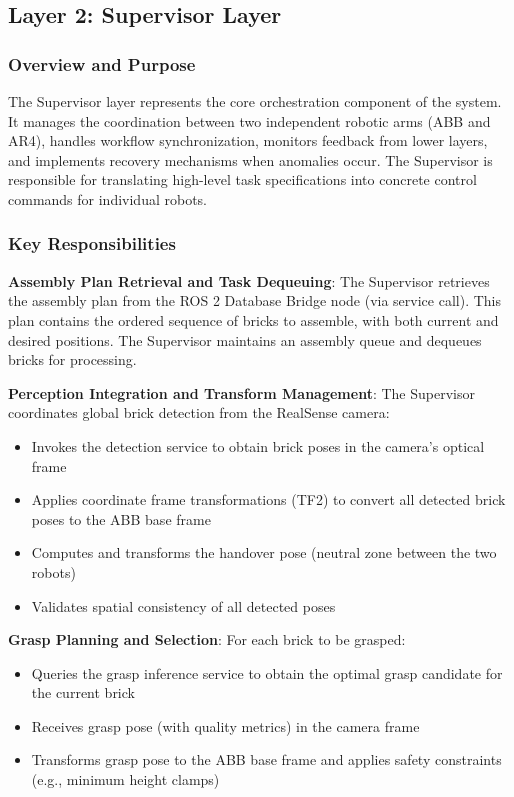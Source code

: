 \subsection{Layer 2: Supervisor Layer}
\label{subsec:supervisor_layer}

\subsubsection{Overview and Purpose}
The Supervisor layer represents the core orchestration component of the system. It manages the coordination between two independent robotic arms (ABB and AR4), handles workflow synchronization, monitors feedback from lower layers, and implements recovery mechanisms when anomalies occur. The Supervisor is responsible for translating high-level task specifications into concrete control commands for individual robots.

\subsubsection{Key Responsibilities}

\textbf{Assembly Plan Retrieval and Task Dequeuing}: The Supervisor retrieves the assembly plan from the ROS 2 Database Bridge node (via service call). This plan contains the ordered sequence of bricks to assemble, with both current and desired positions. The Supervisor maintains an assembly queue and dequeues bricks for processing.

\textbf{Perception Integration and Transform Management}: The Supervisor coordinates global brick detection from the RealSense camera:
\begin{itemize}
    \item Invokes the detection service to obtain brick poses in the camera's optical frame
    \item Applies coordinate frame transformations (TF2) to convert all detected brick poses to the ABB base frame
    \item Computes and transforms the handover pose (neutral zone between the two robots)
    \item Validates spatial consistency of all detected poses
\end{itemize}

\textbf{Grasp Planning and Selection}: For each brick to be grasped:
\begin{itemize}
    \item Queries the grasp inference service to obtain the optimal grasp candidate for the current brick
    \item Receives grasp pose (with quality metrics) in the camera frame
    \item Transforms grasp pose to the ABB base frame and applies safety constraints (e.g., minimum height clamps)
\end{itemize}

